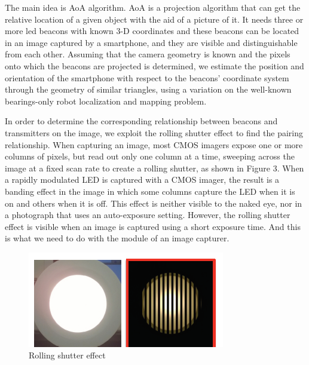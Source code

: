 \documentclass[a4paper, 11pt]{article} %
\begin{document}
The main idea is AoA algorithm. AoA is a projection algorithm that can get the relative location of a given object with the aid of a picture of it. It needs three or more led beacons with known 3-D coordinates and these beacons can be located in an image captured by a smartphone, and they are visible and distinguishable from each other. Assuming that the camera geometry is known and the pixels onto which the beacons are projected is determined, we estimate the position and orientation of the smartphone with respect to the beacons' coordinate system through the geometry of similar triangles, using a variation on the well-known bearings-only robot localization and mapping problem\cite{AoA}.

In order to determine the corresponding relationship between beacons and transmitters on the image, we exploit the rolling shutter effect to find the pairing relationship. When capturing an image, most CMOS imagers expose one or more columns of pixels, but read out only one column at a time, sweeping across the image at a fixed scan rate to create a rolling shutter, as shown in Figure 3. When a rapidly modulated LED is captured with a CMOS imager, the result is a banding effect in the image in which some columns capture the LED when it is on and others when it is off. This effect is neither visible to the naked eye, nor in a photograph that uses an auto-exposure setting. However, the rolling shutter effect is visible when an image is captured using a short exposure time. And this is what we need to do with the module of an image capturer.

\begin{figure}[h]
	\centering 
	\includegraphics[width=0.8\linewidth]{Figure2.png}
	\caption{Rolling shutter effect}
	\label{fig:subfig}
\end{figure}
\end{document}
